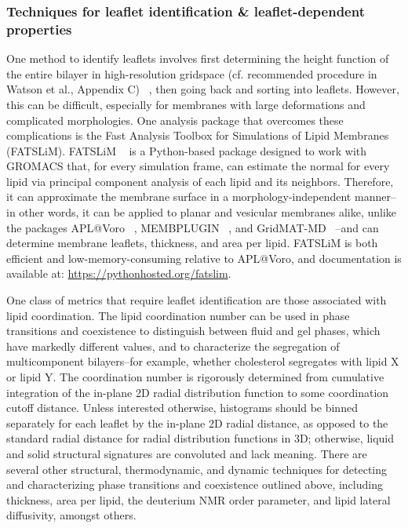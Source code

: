 \documentclass[9pt,bestpractices,pubversion]{livecoms}
\begin{document}
\subsubsection{Techniques for leaflet identification \& leaflet-dependent properties}
\label{subsubsec:leafid-props}
One method to identify leaflets involves first determining the height function of the entire bilayer in high-resolution gridspace (cf. recommended procedure in Watson et al., Appendix C) ~\cite{Watson2011a}, then going back and sorting into leaflets.
However, this can be difficult, especially for membranes with large deformations and complicated morphologies.
One analysis package that overcomes these complications is the Fast Analysis Toolbox for Simulations of Lipid Membranes (FATSLiM).
FATSLiM ~\cite{Buchoux2017} is a Python-based package designed to work with GROMACS that, for every simulation frame, can estimate the normal for every lipid via principal component analysis of each lipid and its neighbors.
Therefore, it can approximate the membrane surface in a morphology-independent manner--in other words, it can be applied to planar and vesicular membranes alike, unlike the packages APL@Voro ~\cite{Lukat2013}, MEMBPLUGIN ~\cite{Guixa-Gonzalez2014a}, and GridMAT-MD ~\cite{Truhlar2009a}--and can determine membrane leaflets, thickness, and area per lipid.
FATSLiM is both efficient and low-memory-consuming relative to APL@Voro, and documentation is available at: \url{https://pythonhosted.org/fatslim}.

One class of metrics that require leaflet identification are those associated with lipid coordination.
The lipid coordination number can be used in phase transitions and coexistence to distinguish between fluid and gel phases, which have markedly different values, and to characterize the segregation of multicomponent bilayers--for example, whether cholesterol segregates with lipid X or lipid Y.
The coordination number is rigorously determined from cumulative integration of the in-plane 2D radial distribution function to some coordination cutoff distance.
Unless interested otherwise, histograms should be binned separately for each leaflet by the in-plane 2D radial distance, as opposed to the standard radial distance for radial distribution functions in 3D; otherwise, liquid and solid structural signatures are convoluted and lack meaning.
There are several other structural, thermodynamic, and dynamic techniques for detecting and characterizing phase transitions and coexistence outlined above, including thickness, area per lipid, the deuterium NMR order parameter, and lipid lateral diffusivity, amongst others.
\end{document}

